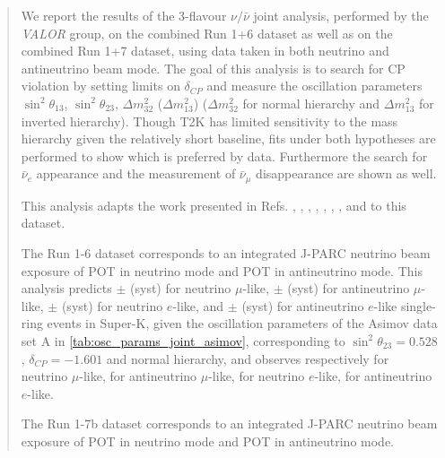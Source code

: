 \begin{frontmatter}
\begin{abstract}
We report the results of the
3-flavour $\nu/\bar{\nu}$ joint analysis, performed by the {\em VALOR} group,
on the combined Run 1+6 dataset as well as on the combined Run 1+7 dataset, 
using data taken in both neutrino and antineutrino beam mode.
The goal of this analysis is 
to search for CP violation by setting limits on $\delta_{CP}$
and measure the oscillation parameters
$\sin^2 \theta_{13}$, $\sin^2 \theta_{23}$, $\Delta m^2_{32}$ ($\Delta m^2_{13}$) 
($\Delta m^2_{32}$ for normal hierarchy and $\Delta m^2_{13}$ for inverted hierarchy).
Though T2K has limited sensitivity to the mass hierarchy given the relatively short baseline,
fits under both hypotheses are performed to show which is preferred by data.
Furthermore the search for $\bar{\nu}_e$ appearance and 
the measurement of $\bar{\nu}_{\mu}$ disappearance are shown as well.

This analysis adapts the work presented in Refs. 
\cite{OurRun1DisappAnalysis},
\cite{OurRun12DisappAnalysis}, 
\cite{OurRun12DisappAnalysis3Flavour},
\cite{OurRun123DisappAnalysis3Flavour},
\cite{OurRun1234aDisappAnalysis3Flavour},
\cite{OurRun1234DisappAnalysis3Flavour},
\cite{OurRun123JointOscillationAnalysis},
\cite{OurRun1234JointOscillationAnalysis}
\cite{OurRun56AntiNumuDisappearanceAnalysis3Flavour} 
and
\cite{OurRun56AntiNueBarAppearanceAnalysis3Flavour}
to this dataset.


The Run 1-6 dataset corresponds to an integrated J-PARC neutrino beam
exposure of \TotalPotNu{} POT in neutrino mode and
\TotalPotNuBar{} POT in antineutrino mode.
This analysis predicts 
\NskOscExpectationNumu{} $\pm$ \NskOscExpectationNumuError{} (syst) for neutrino $\mu$-like,
\NskOscExpectationNumuBar{} $\pm$ \NskOscExpectationNumuBarError{} (syst) for antineutrino $\mu$-like,
\NskOscExpectationNue{} $\pm$ \NskOscExpectationNueError{} (syst) for neutrino $e$-like,
and
\NskOscExpectationNueBar{} $\pm$ \NskOscExpectationNueBarError{} (syst) for antineutrino $e$-like
single-ring events in Super-K,
given the oscillation parameters of the Asimov data set A in \cref{tab:osc_params_joint_asimov},
corresponding to $\sin^2 \theta_{23} = 0.528$, $\delta_{CP} = -1.601$ and normal hierarchy, 
and observes respectively 
\NskObservedNumu{} for neutrino $\mu$-like,
\NskObservedNumuBar{}  for antineutrino $\mu$-like,
\NskObservedNue{}  for neutrino $e$-like,
\NskObservedNueBar{}  for antineutrino $e$-like.


The Run 1-7b dataset corresponds to an integrated J-PARC neutrino beam
exposure of \TotalPotNuRunOneSevenB{} POT in neutrino mode and
\TotalPotNuBarRunOneSevenB{} POT in antineutrino mode.


\end{abstract}
\end{frontmatter}
